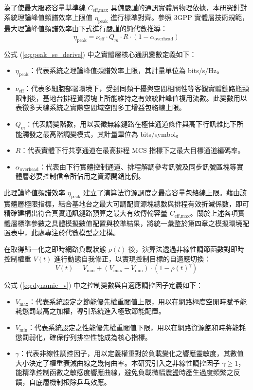 為了使最大服務容量基準線 $C_{\text{eff,max}}$ 具備嚴謹的通訊實體層物理依據，本研究針對系統理論峰值頻譜效率上限值 $\eta_{\text{peak}}$ 進行標準對齊。參照 3GPP 實體層技術規範，最大理論峰值頻譜效率由下式進行嚴謹的純代數推導：
\begin{equation}
    \eta_{\text{peak}} = \nu_{\text{eff}} \cdot Q_m \cdot R \cdot (1 - \alpha_{\text{overhead}})
    \label{eq:peak_se_derive}
\end{equation}

公式 (\ref{eq:peak_se_derive}) 中之實體層核心通訊變數定義如下：
\begin{itemize}
    \item $\eta_{\text{peak}}$：代表系統之理論峰值頻譜效率上限，其計量單位為 bits/s/Hz。
    \item $\nu_{\text{eff}}$：代表多細胞部署環境下，受到同頻干擾與空間相關性等客觀實體鏈路瓶頸限制後，基地台排程資源塊上所能維持之有效統計峰值複用流數。此變數用以表徵多天線系統之實際空間域空間多工增益包絡線上限。
    \item $Q_m$：代表調變階數，用以表徵無線鏈路在極佳通道條件與高下行訊雜比下所能觸發之最高階調變模式，其計量單位為 bits/symbol。
    \item $R$：代表實體下行共享通道在最高排程 MCS 指標下之最大目標通道編碼率。
    \item $\alpha_{\text{overhead}}$：代表由下行實體控制通道、排程解調參考訊號及同步訊號區塊等實體層必要控制信令所佔用之資源開銷比例。
\end{itemize}

此理論峰值頻譜效率 $\eta_{\text{peak}}$ 建立了演算法資源調度之最高容量包絡線上限。藉由該實體層極限指標，結合基地台之最大可調配資源塊總數與排程有效折減係數，即可精確建構出符合真實通訊鏈路預算之最大有效傳輸容量 $C_{\text{eff,max}}$。關於上述各項實體層標準參數之具體模擬數值配置與校準結果，將統一彙整於第四章之模擬環境配置表中，此處專注於代數模型之建構。

在取得歸一化之即時網路負載狀態 $\rho(t)$ 後，演算法透過非線性調節函數對即時控制權重 $V(t)$ 進行動態自我修正，以實現控制目標的自適應切換：
\begin{equation}
    V(t) = V_{\text{min}} + (V_{\text{max}} - V_{\text{min}}) \cdot (1 - \rho(t)^{\gamma})
    \label{eq:dynamic_v}
\end{equation}

公式 (\ref{eq:dynamic_v}) 中之控制變數與自適應調控因子定義如下：
\begin{itemize}
    \item $V_{\text{max}}$：代表系統設定之節能優先權重閾值上限，用以在網路極度空閒時賦予能耗懲罰最高之加權，導引系統進入極致節能配置。
    \item $V_{\text{min}}$：代表系統設定之性能優先權重閾值下限，用以在網路資源飽和時將能耗懲罰弱化，確保佇列排空性能成為核心指標。
    \item $\gamma$：代表非線性調控因子，用以定義權重對於負載變化之響應靈敏度，其數值大小決定了權重衰減曲線之幾何曲率。本研究引入之非線性調控因子 $\gamma \ge 1$，能精準控制函數之敏感度響應曲線，避免負載微幅震盪時產生過度頻繁之反饋，自底層機制根除乒乓效應。
\end{itemize}


